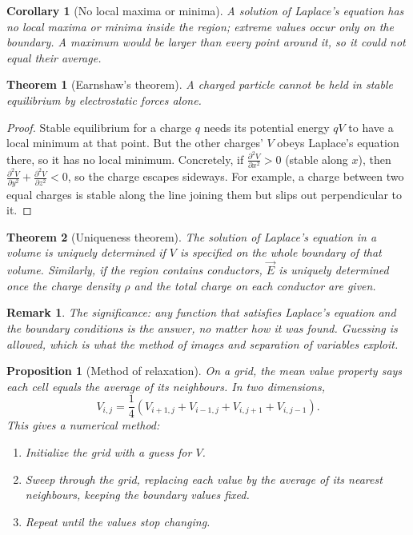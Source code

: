 \documentclass{article}
\newtheorem{theorem}{Theorem}
\newtheorem{corollary}{Corollary}[theorem]
\newtheorem{remark}{Remark}
\newtheorem{proposition}{Proposition}
\begin{document}
\begin{corollary}[No local maxima or minima]
    A solution of Laplace's equation has no local maxima or minima inside the region; extreme values occur only on the boundary. A maximum would be larger than every point around it, so it could not equal their average.
\end{corollary}
\begin{theorem}[Earnshaw's theorem]
    A charged particle cannot be held in stable equilibrium by electrostatic forces alone.
\end{theorem}
\begin{proof}
    Stable equilibrium for a charge $q$ needs its potential energy $qV$ to have a local minimum at that point. But the other charges' $V$ obeys Laplace's equation there, so it has no local minimum. Concretely, if $\frac{\partial^2 V}{\partial x^2} > 0$ (stable along $x$), then $\frac{\partial^2 V}{\partial y^2} + \frac{\partial^2 V}{\partial z^2} < 0$, so the charge escapes sideways. For example, a charge between two equal charges is stable along the line joining them but slips out perpendicular to it.
\end{proof}
\begin{theorem}[Uniqueness theorem]
    The solution of Laplace's equation in a volume is uniquely determined if $V$ is specified on the whole boundary of that volume. Similarly, if the region contains conductors, $\vec{E}$ is uniquely determined once the charge density $\rho$ and the total charge on each conductor are given.
\end{theorem}
\begin{remark}
    The significance: any function that satisfies Laplace's equation and the boundary conditions is \emph{the} answer, no matter how it was found. Guessing is allowed, which is what the method of images and separation of variables exploit.
\end{remark}
\begin{proposition}[Method of relaxation]
    On a grid, the mean value property says each cell equals the average of its neighbours. In two dimensions,
    \[V_{i,j} = \frac{1}{4}\left(V_{i+1,j} + V_{i-1,j} + V_{i,j+1} + V_{i,j-1}\right).\]
    This gives a numerical method:
    \begin{enumerate}
        \item Initialize the grid with a guess for $V$.
        \item Sweep through the grid, replacing each value by the average of its nearest neighbours, keeping the boundary values fixed.
        \item Repeat until the values stop changing.
    \end{enumerate}
\end{proposition}
\end{document}
